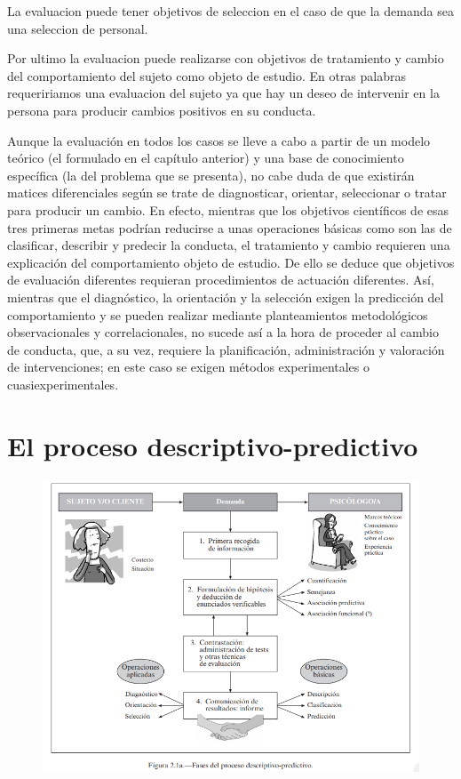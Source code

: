 \documentclass[12pt,a4paper]{article}
\begin{document}
La evaluacion puede tener objetivos de seleccion en el caso de que la demanda sea una seleccion de personal.

Por ultimo la evaluacion puede realizarse con objetivos de tratamiento y cambio del comportamiento del sujeto como objeto de estudio. En otras palabras requeririamos una evaluacion del sujeto ya que hay un deseo de intervenir en la persona para producir cambios positivos en su conducta. 

\begin{shaded}
	Aunque la evaluación en todos los casos se lleve a cabo a partir de un modelo teórico (el formulado en el capítulo anterior) y una base de conocimiento específica (la del problema que se
presenta), no cabe duda de que existirán matices
diferenciales según se trate de diagnosticar, orientar, seleccionar o tratar para producir un cambio.
En efecto, mientras que los objetivos científicos
de esas tres primeras metas podrían reducirse a
unas operaciones básicas como son las de clasificar, describir y predecir la conducta, el tratamiento y cambio requieren una explicación del comportamiento objeto de estudio. De ello se deduce
que objetivos de evaluación diferentes requieran procedimientos de actuación diferentes. Así,
mientras que el diagnóstico, la orientación y la
selección exigen la predicción del comportamiento y se pueden realizar mediante planteamientos
metodológicos observacionales y correlacionales,
no sucede así a la hora de proceder al cambio de
conducta, que, a su vez, requiere la planificación,
administración y valoración de intervenciones; en
este caso se exigen métodos experimentales o cuasiexperimentales.
\end{shaded}


\section{El proceso descriptivo-predictivo}%

\begin{figure}[!h!]
	\centering
	\includegraphics[width=1\linewidth]{fases.png}
	\label{fig:fases}
\end{figure}
\end{document}
